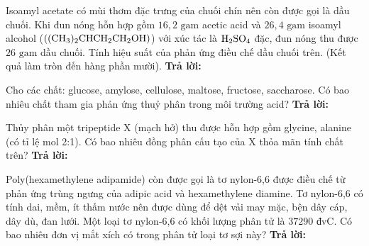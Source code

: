 \documentclass[11pt,a4paper]{article}
\begin{document}
\begin{ex}
Isoamyl acetate có mùi thơm đặc trưng của chuối chín nên còn được gọi là dầu chuối. Khi đun nóng hỗn hợp gồm $16,2\text{ gam}$ acetic acid và $26,4\text{ gam}$ isoamyl alcohol ($\ce{((CH3)2CHCH2CH2OH)}$) với xúc tác là $\ce{H2SO4}$ đặc, đun nóng thu được $26\text{ gam}$ dầu chuối. Tính hiệu suất của phản ứng điều chế dầu chuối trên. (Kết quả làm tròn đến hàng phần mười).
\hfill \textbf{Trả lời:} \dotfill

\end{ex}
\begin{ex}
Cho các chất: glucose, amylose, cellulose, maltose, fructose, saccharose. Có bao nhiêu chất tham gia phản ứng thuỷ phân trong môi trường acid?
\hfill \textbf{Trả lời:} \dotfill

\end{ex}
\begin{ex}
Thủy phân một tripeptide X (mạch hở) thu được hỗn hợp gồm glycine, alanine (có tỉ lệ mol 2:1). Có bao nhiêu đồng phân cấu tạo của X thỏa mãn tính chất trên?
\hfill \textbf{Trả lời:} \dotfill

\end{ex}
\begin{ex}
Poly(hexamethylene adipamide) còn được gọi là tơ nylon-6,6 được điều chế từ phản ứng trùng ngưng của adipic acid và hexamethylene diamine. Tơ nylon-6,6 có tính dai, mềm, ít thấm nước nên được dùng để dệt vải may mặc, bện dây cáp, dây dù, đan lưới. Một loại tơ nylon-6,6 có khối lượng phân tử là $37290\text{ đvC}$. Có bao nhiêu đơn vị mắt xích có trong phân tử loại tơ sợi này?
\hfill \textbf{Trả lời:} \dotfill

\end{ex}
\end{document}
